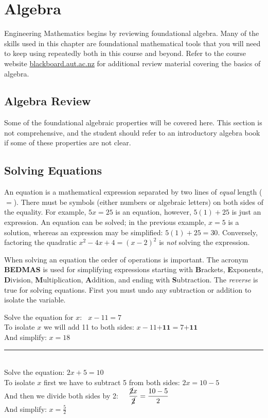 \chapter{Algebra}
Engineering Mathematics begins by reviewing foundational algebra. Many of the skills used in this chapter are foundational mathematical tools that you will need to keep using repeatedly both in this course and beyond. Refer to the course website \url{blackboard.aut.ac.nz} for additional review material covering the basics of algebra.

\section{Algebra Review}\label{sec:introAlgebra}
Some of the foundational algebraic properties will be covered here. This section is not comprehensive, and the student should refer to an introductory algebra book if some of these properties are not clear.


\section*{Solving Equations}
An equation is a mathematical expression separated by two lines of \textit{equal} length ($=$). There must be symbols (either numbers or algebraic letters) on both sides of the equality. For example, $5x=25$ is an equation, however, $5(1)+25$ is just an expression. An equation can be solved; in the previous example, $x=5$ is a solution, whereas an expression may be simplified: $5(1)+25=30$. Conversely, factoring the quadratic $x^2-4x+4=(x-2)^2$ is \textit{not} solving the expression.

When solving an equation the order of operations is important. The acronym \textbf{BEDMAS} is used for simplifying expressions starting with \textbf{B}rackets, \textbf{E}xponents, \textbf{D}ivision, \textbf{M}ultiplication, \textbf{A}ddition, and ending with \textbf{S}ubtraction. The \textit{reverse} is true for solving equations. First you must undo any subtraction or addition to isolate the variable.

\example Solve the equation for $x$: $\phantom{a}x-11=7$\medskip\\
\solution To isolate $x$ we will add 11 to both sides: $x-11\textbf{+11}=7\textbf{+11}$\\
And simplify: $x=18$\\
\rule{6.8cm}{0.5pt}\\
\example Solve the equation: $2x+5=10$\medskip\\
\solution To isolate $x$ first we have to subtract 5 from both sides: $2x=10-5$\\
And then we divide both sides by 2: $\displaystyle\phantom{aa}\frac{\cancel{2}x}{\cancel{2}}=\frac{10-5}{2}$\\
And simplify: $\displaystyle x=\frac{5}{2}$

